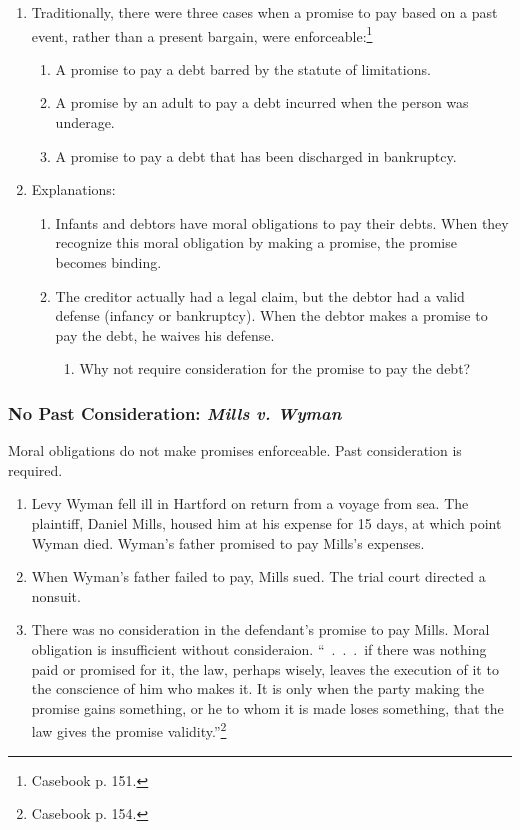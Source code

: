 \begin{enumerate}
    \item Traditionally, there were three cases when a promise to pay based on 
    a past event, rather than a present bargain, were 
    enforceable:\footnote{Casebook p. 151.}
    \begin{enumerate}
        \item A promise to pay a debt barred by the statute of limitations.
        \item A promise by an adult to pay a debt incurred when the person was 
        underage.
        \item A promise to pay a debt that has been discharged in bankruptcy.
    \end{enumerate}
    \item Explanations:
    \begin{enumerate}
        \item Infants and debtors have moral obligations to pay their debts. 
        When they recognize this moral obligation by making a promise, the 
        promise becomes binding.
        \item The creditor actually had a legal claim, but the debtor had a 
        valid defense (infancy or bankruptcy). When the debtor makes a 
        promise to pay the debt, he waives his defense.
        \begin{enumerate}
            \item Why not require consideration for the promise to pay the 
            debt?
        \end{enumerate}
    \end{enumerate}
\end{enumerate}

\subsubsection{No Past Consideration: \emph{Mills v. Wyman}}

Moral obligations do not make promises enforceable. Past consideration is 
required.

\begin{enumerate}
    \item Levy Wyman fell ill in Hartford on return from a voyage from sea. 
    The plaintiff, Daniel Mills, housed him at his expense for 15 days, at 
    which point Wyman died. Wyman's father promised to pay Mills's expenses.
    \item When Wyman's father failed to pay, Mills sued. The trial court 
    directed a nonsuit.
    \item There was no consideration in the defendant's promise to pay Mills. 
    Moral obligation is insufficient without consideraion. ``~.~.~.~if there 
    was nothing paid or promised for it, the law, perhaps wisely, leaves the 
    execution of it to the conscience of him who makes it. It is only when the 
    party making the promise gains something, or he to whom it is made loses 
    something, that the law gives the promise validity.''\footnote{Casebook p. 
    154.}
\end{enumerate}

